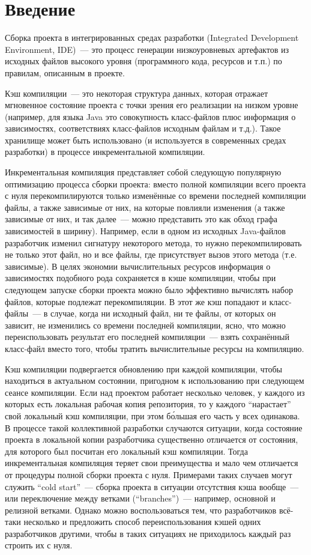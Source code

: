 \section*{Введение}
Сборка проекта в интегрированных средах разработки (Integrated Development Environment, IDE)~--- это процесс генерации низкоуровневых артефактов из исходных файлов высокого уровня (программного кода, ресурсов и т.п.) по правилам, описанным в проекте.

Кэш компиляции~--- это некоторая структура данных, которая отражает мгновенное состояние проекта с точки зрения его реализации на низком уровне (например, для языка Java это совокупность класс-файлов плюс информация о зависимостях, соответствиях класс-файлов исходным файлам и т.д.). Такое хранилище может быть использовано (и используется в современных средах разработки) в процессе инкрементальной компиляции.

Инкрементальная компиляция представляет собой следующую популярную оптимизацию процесса сборки проекта: вместо полной компиляции всего проекта с нуля перекомпилируются только изменённые со времени последней компиляции файлы, а также зависимые от них, на которые повлияли изменения (а также зависимые от них, и так далее~--- можно представить это как обход графа зависимостей в ширину). Например, если в одном из исходных Java-файлов разработчик изменил сигнатуру некоторого метода, то нужно перекомпилировать не только этот файл, но и все файлы, где присутствует вызов этого метода (т.е. зависимые). В целях экономии вычислительных ресурсов информация о зависимостях подобного рода сохраняется в кэше компиляции, чтобы при следующем запуске сборки проекта можно было эффективно вычислять набор файлов, которые подлежат перекомпиляции. В этот же кэш попадают и класс-файлы~--- в случае, когда ни исходный файл, ни те файлы, от которых он зависит, не изменились со времени последней компиляции, ясно, что можно переиспользовать результат его последней компиляции~--- взять сохранённый класс-файл вместо того, чтобы тратить вычислительные ресурсы на компиляцию.

Кэш компиляции подвергается обновлению при каждой компиляции, чтобы находиться в актуальном состоянии, пригодном к использованию при следующем сеансе компиляции. Если над проектом работает несколько человек, у каждого из которых есть локальная рабочая копия репозитория, то у каждого ``нарастает'' свой локальный кэш компиляции, при этом б\'{о}льшая его часть у всех одинакова. В процессе такой коллективной разработки случаются ситуации, когда состояние проекта в локальной копии разработчика существенно отличается от состояния, для которого был посчитан его локальный кэш компиляции. Тогда инкрементальная компиляция теряет свои преимущества и мало чем отличается от процедуры полной сборки проекта с нуля. Примерами таких случаев могут служить ``cold start''~--- сборка проекта в ситуации отсутствия кэша вообще~--- или переключение между ветками (``branches'')~--- например, основной и релизной ветками. Однако можно воспользоваться тем, что разработчиков всё-таки несколько и предложить способ переиспользования кэшей одних разработчиков другими, чтобы в таких ситуациях не приходилось каждый раз строить их с нуля.

